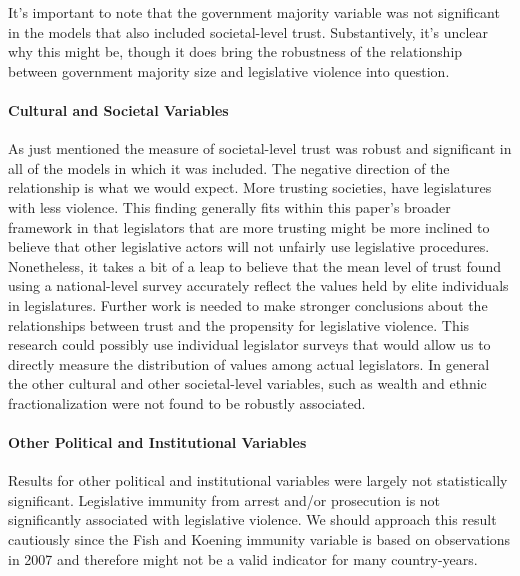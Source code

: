 \documentclass[a4paper]{article}\usepackage{graphicx, color}
\begin{document}
It's important to note that the government majority variable was not significant in the models that also included societal-level trust. Substantively, it's unclear why this might be, though it does bring the robustness of the relationship between government majority size and legislative violence into question. 

\paragraph{Cultural and Societal Variables}

As just mentioned the measure of societal-level trust was robust and significant in all of the models in which it was included. The negative direction of the relationship is what we would expect. More trusting societies, have legislatures with less violence. This finding generally fits within this paper's broader framework in that legislators that are more trusting might be more inclined to believe that other legislative actors will not unfairly use legislative procedures. Nonetheless, it takes a bit of a leap to believe that the mean level of trust found using a national-level survey accurately reflect the values held by elite individuals in legislatures. Further work is needed to make stronger conclusions about the relationships between trust and the propensity for legislative violence. This research could possibly use individual legislator surveys that would allow us to directly measure the distribution of values among actual legislators. In general the other cultural and other societal-level variables, such as wealth and ethnic fractionalization were not found to be robustly associated. 

\paragraph{Other Political and Institutional Variables}
Results for other political and institutional variables were largely not statistically significant. Legislative immunity from arrest and/or prosecution is not significantly associated with legislative violence. We should approach this result cautiously since the Fish and Koening immunity variable is based on observations in 2007 and therefore might not be a valid indicator for many country-years.
\end{document}
